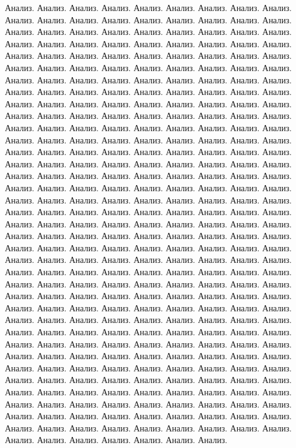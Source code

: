 Анализ. Анализ. Анализ. Анализ. Анализ. Анализ. Анализ. Анализ. Анализ. Анализ. Анализ.
Анализ. Анализ. Анализ. Анализ. Анализ.
Анализ. Анализ. Анализ. Анализ. Анализ. Анализ. Анализ. Анализ. Анализ. Анализ. Анализ.
Анализ. Анализ. Анализ. Анализ. Анализ.
Анализ. Анализ. Анализ. Анализ. Анализ. Анализ. Анализ. Анализ. Анализ. Анализ. Анализ.
Анализ. Анализ. Анализ. Анализ. Анализ.
Анализ. Анализ. Анализ. Анализ. Анализ. Анализ. Анализ. Анализ. Анализ. Анализ. Анализ.
Анализ. Анализ. Анализ. Анализ. Анализ.
Анализ. Анализ. Анализ. Анализ. Анализ. Анализ. Анализ. Анализ. Анализ. Анализ. Анализ.
Анализ. Анализ. Анализ. Анализ. Анализ.
Анализ. Анализ. Анализ. Анализ. Анализ. Анализ. Анализ. Анализ. Анализ. Анализ. Анализ.
Анализ. Анализ. Анализ. Анализ. Анализ.
Анализ. Анализ. Анализ. Анализ. Анализ. Анализ. Анализ. Анализ. Анализ. Анализ. Анализ.
Анализ. Анализ. Анализ. Анализ. Анализ.
Анализ. Анализ. Анализ. Анализ. Анализ. Анализ. Анализ. Анализ. Анализ. Анализ. Анализ.
Анализ. Анализ. Анализ. Анализ. Анализ.
Анализ. Анализ. Анализ. Анализ. Анализ. Анализ. Анализ. Анализ. Анализ. Анализ. Анализ.
Анализ. Анализ. Анализ. Анализ. Анализ.
Анализ. Анализ. Анализ. Анализ. Анализ. Анализ. Анализ. Анализ. Анализ. Анализ. Анализ.
Анализ. Анализ. Анализ. Анализ. Анализ.
Анализ. Анализ. Анализ. Анализ. Анализ. Анализ. Анализ. Анализ. Анализ. Анализ. Анализ.
Анализ. Анализ. Анализ. Анализ. Анализ.
Анализ. Анализ. Анализ. Анализ. Анализ. Анализ. Анализ. Анализ. Анализ. Анализ. Анализ.
Анализ. Анализ. Анализ. Анализ. Анализ.
Анализ. Анализ. Анализ. Анализ. Анализ. Анализ. Анализ. Анализ. Анализ. Анализ. Анализ.
Анализ. Анализ. Анализ. Анализ. Анализ.
Анализ. Анализ. Анализ. Анализ. Анализ. Анализ. Анализ. Анализ. Анализ. Анализ. Анализ.
Анализ. Анализ. Анализ. Анализ. Анализ.
Анализ. Анализ. Анализ. Анализ. Анализ. Анализ. Анализ. Анализ. Анализ. Анализ. Анализ.
Анализ. Анализ. Анализ. Анализ. Анализ.
Анализ. Анализ. Анализ. Анализ. Анализ. Анализ. Анализ. Анализ. Анализ. Анализ. Анализ.
Анализ. Анализ. Анализ. Анализ. Анализ.
Анализ. Анализ. Анализ. Анализ. Анализ. Анализ. Анализ. Анализ. Анализ. Анализ. Анализ.
Анализ. Анализ. Анализ. Анализ. Анализ.
Анализ. Анализ. Анализ. Анализ. Анализ. Анализ. Анализ. Анализ. Анализ. Анализ. Анализ.
Анализ. Анализ. Анализ. Анализ. Анализ.
Анализ. Анализ. Анализ. Анализ. Анализ. Анализ. Анализ. Анализ. Анализ. Анализ. Анализ.
Анализ. Анализ. Анализ. Анализ. Анализ.
Анализ. Анализ. Анализ. Анализ. Анализ. Анализ. Анализ. Анализ. Анализ. Анализ. Анализ.
Анализ. Анализ. Анализ. Анализ. Анализ.
Анализ. Анализ. Анализ. Анализ. Анализ. Анализ. Анализ. Анализ. Анализ. Анализ. Анализ.
